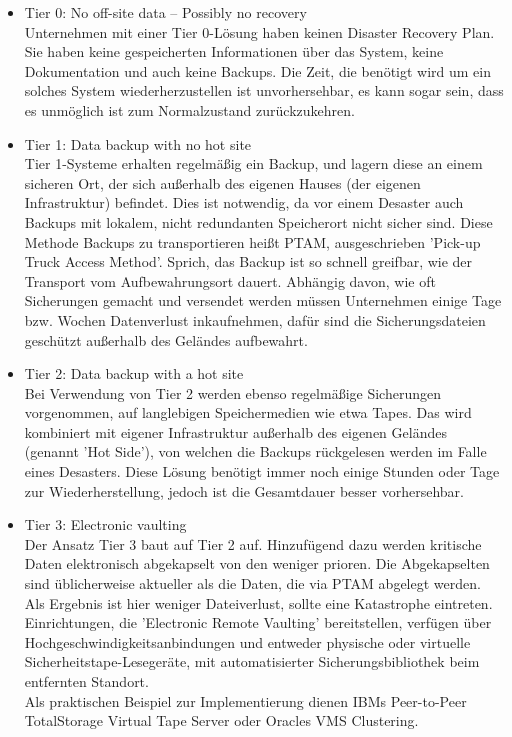 \documentclass[letterpaper, 12pt]{article}
\begin{document}
\begin{itemize}
	\item Tier 0: No off-site data – Possibly no recovery \\
	Unternehmen mit einer Tier 0-Lösung haben keinen Disaster Recovery Plan. Sie haben keine gespeicherten Informationen über das System, keine Dokumentation und auch keine Backups. Die Zeit, die benötigt wird um ein solches System wiederherzustellen ist unvorhersehbar, es kann sogar sein, dass es unmöglich ist zum Normalzustand zurückzukehren.
	\item Tier 1: Data backup with no hot site \\
	Tier 1-Systeme erhalten regelmäßig ein Backup, und lagern diese an einem sicheren Ort, der sich außerhalb des eigenen Hauses (der eigenen Infrastruktur) befindet. Dies ist notwendig, da vor einem Desaster auch Backups mit lokalem, nicht redundanten Speicherort nicht sicher sind. Diese Methode Backups zu transportieren heißt PTAM, ausgeschrieben 'Pick-up Truck Access Method'. Sprich, das Backup ist so schnell greifbar, wie der Transport vom Aufbewahrungsort dauert. Abhängig davon, wie oft Sicherungen gemacht und versendet werden müssen Unternehmen einige Tage bzw. Wochen Datenverlust inkaufnehmen, dafür sind die Sicherungsdateien geschützt außerhalb des Geländes aufbewahrt.
	\item Tier 2: Data backup with a hot site \\
	Bei Verwendung von Tier 2 werden ebenso regelmäßige Sicherungen vorgenommen, auf langlebigen Speichermedien wie etwa Tapes. Das wird kombiniert mit eigener Infrastruktur außerhalb des eigenen Geländes (genannt 'Hot Side'), von welchen die Backups rückgelesen werden im Falle eines Desasters. Diese Lösung benötigt immer noch einige Stunden oder Tage zur Wiederherstellung, jedoch ist die Gesamtdauer besser vorhersehbar.
	\item Tier 3: Electronic vaulting \\
	Der Ansatz Tier 3 baut auf Tier 2 auf. Hinzufügend dazu werden kritische Daten elektronisch abgekapselt von den weniger prioren. Die Abgekapselten sind üblicherweise aktueller als die Daten, die via PTAM abgelegt werden. Als Ergebnis ist hier weniger Dateiverlust, sollte eine Katastrophe eintreten. \\ Einrichtungen, die 'Electronic Remote Vaulting' bereitstellen, verfügen über Hochgeschwindigkeitsanbindungen und entweder physische oder virtuelle Sicherheitstape-Lesegeräte, mit automatisierter Sicherungsbibliothek beim entfernten Standort. \\ Als praktischen Beispiel zur Implementierung dienen IBMs Peer-to-Peer TotalStorage Virtual Tape Server oder Oracles VMS Clustering.

\end{itemize}
\end{document}
